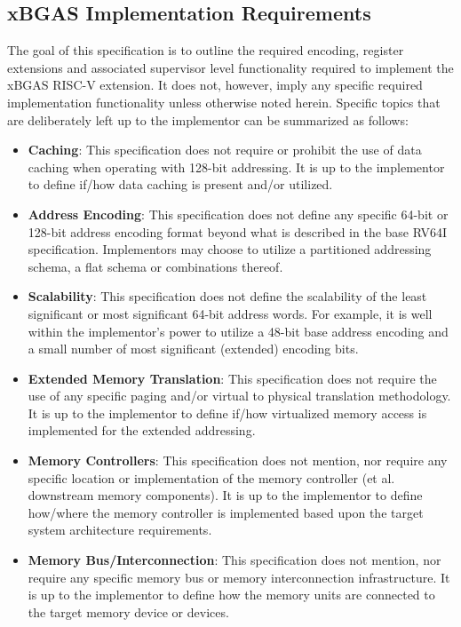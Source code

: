 \documentclass{article}
\begin{document}
\subsection{xBGAS Implementation Requirements}

The goal of this specification is to outline the required encoding, register extensions 
and associated supervisor level functionality required to implement the xBGAS 
RISC-V extension.  It does not, however, imply any specific required implementation 
functionality unless otherwise noted herein.  Specific topics that are deliberately 
left up to the implementor can be summarized as follows:

\begin{itemize}
\item \textbf{Caching}: This specification does not require or prohibit the use of data caching 
when operating with 128-bit addressing.  It is up to the implementor to define if/how data caching 
is present and/or utilized.  

\item \textbf{Address Encoding}: This specification does not define any specific 64-bit or 128-bit 
address encoding format beyond what is described in the base RV64I specification.  Implementors 
may choose to utilize a partitioned addressing schema, a flat schema or combinations thereof.    

\item \textbf{Scalability}: This specification does not define the scalability of the least significant 
or most significant 64-bit address words.  For example, it is well within the implementor's power to 
utilize a 48-bit base address encoding and a small number of most significant (extended) encoding bits.

\item \textbf{Extended Memory Translation}: This specification does not require the use of any 
specific paging and/or virtual to physical translation methodology.  It is up to the implementor to define 
if/how virtualized memory access is implemented for the extended addressing.

\item \textbf{Memory Controllers}: This specification does not mention, nor require any specific 
location or implementation of the memory controller (et al. downstream memory components).  It is 
up to the implementor to define how/where the memory controller is implemented based upon the 
target system architecture requirements.

\item \textbf{Memory Bus/Interconnection}: This specification does not mention, nor require any 
specific memory bus or memory interconnection infrastructure.  It is up to the implementor to define 
how the memory units are connected to the target memory device or devices.


\end{itemize}
\end{document}
